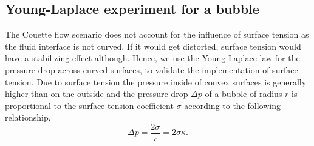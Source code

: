 \documentclass[final,leqno,onefignum,onetabnum]{siamltexmm}
\begin{document}
\subsection{Young-Laplace experiment for a bubble}
The Couette flow scenario does not account for the influence of surface tension as the fluid interface is not curved. If it would get distorted, surface tension would have a stabilizing effect although. 
Hence, we use the Young-Laplace law for the pressure drop across curved surfaces, to validate the implementation of surface tension. Due to surface tension the pressure inside of convex surfaces is generally higher than on the outside and the pressure drop $\Delta p$ of a bubble of radius $r$ is proportional to the surface tension coefficient $\sigma$ according to the following relationship,
\begin{equation}
	\Delta p = \frac{2\sigma}{r} = 2 \sigma \kappa .
\end{equation}
\end{document}
